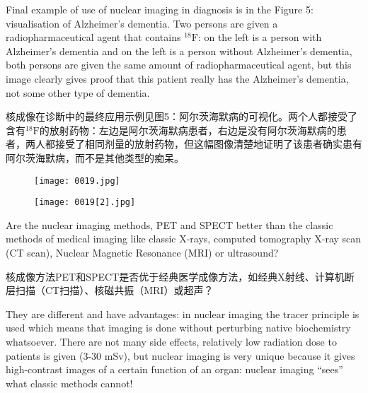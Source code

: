 \documentclass[dvipsnames, svgnames,a4paper,11pt]{article}
\begin{document}
Final example of use of nuclear imaging in diagnosis is in the Figure 5: visualisation of Alzheimer’s dementia. Two persons are given a radiopharmaceutical agent that contains ${}^{18}\text{F}$: on the left is a person with Alzheimer’s dementia and on the left is a person without Alzheimer’s dementia, both persons are given the same amount of radiopharmaceutical agent, but this image clearly gives proof that this patient really has the Alzheimer’s dementia, not some other type of dementia.

核成像在诊断中的最终应用示例见图5：阿尔茨海默病的可视化。两个人都接受了含有${}^{18}\text{F}$的放射药物：左边是阿尔茨海默病患者，右边是没有阿尔茨海默病的患者，两人都接受了相同剂量的放射药物，但这幅图像清楚地证明了该患者确实患有阿尔茨海默病，而不是其他类型的痴呆。

\begin{figure}[htbp]
      \centering
      \texttt{[image: 0019.jpg]}
       \label{fig5}
  \end{figure}

  \begin{figure}[H]
      \centering
      \texttt{[image: 0019[2].jpg]}
       \label{fig6}
  \end{figure}

Are the nuclear imaging methods, PET and SPECT better than the classic methods of medical imaging like classic X-rays, computed tomography X-ray scan (CT scan), Nuclear Magnetic Resonance (MRI) or ultrasound?

核成像方法PET和SPECT是否优于经典医学成像方法，如经典X射线、计算机断层扫描（CT扫描）、核磁共振（MRI）或超声？

They are different and have advantages: in nuclear imaging the tracer principle is used which means that imaging is done without perturbing native biochemistry whatsoever. There are not many side effects, relatively low radiation dose to patients is given (3-30 mSv), but nuclear imaging is very unique because it gives high-contrast images of a certain function of an organ: nuclear imaging “sees” what classic methods cannot!
\end{document}
